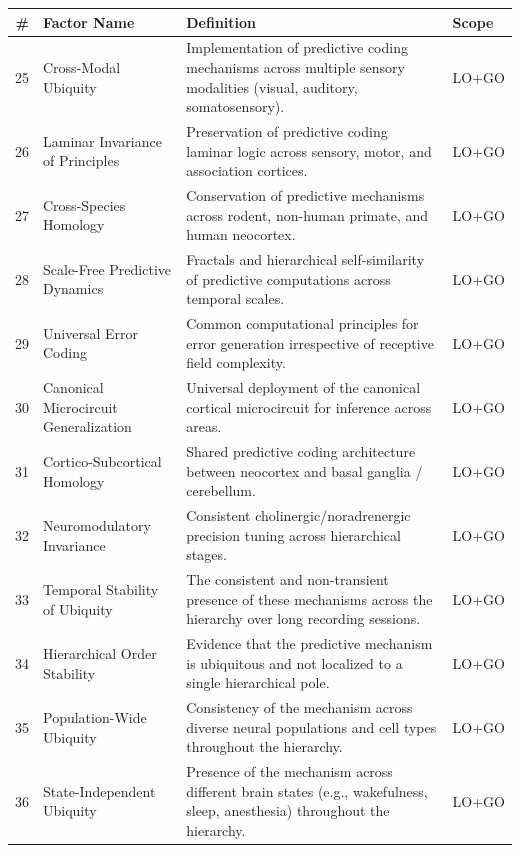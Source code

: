 \documentclass[12pt]{article}
\begin{document}
\newpage

\begingroup
\small
\noindent\begin{tabularx}{\textwidth}{@{}r p{1.9in} >{\raggedright\arraybackslash}X l@{}}
\toprule
\textbf{\#} & \textbf{Factor Name} & \textbf{Definition} & \textbf{Scope} \\
\midrule
25 & Cross-Modal Ubiquity & Implementation of predictive coding mechanisms across multiple sensory modalities (visual, auditory, somatosensory). & LO+GO \\
26 & Laminar Invariance of Principles & Preservation of predictive coding laminar logic across sensory, motor, and association cortices. & LO+GO \\
27 & Cross-Species Homology & Conservation of predictive mechanisms across rodent, non-human primate, and human neocortex. & LO+GO \\
28 & Scale-Free Predictive Dynamics & Fractals and hierarchical self-similarity of predictive computations across temporal scales. & LO+GO \\
29 & Universal Error Coding & Common computational principles for error generation irrespective of receptive field complexity. & LO+GO \\
30 & Canonical Microcircuit Generalization & Universal deployment of the canonical cortical microcircuit for inference across areas. & LO+GO \\
31 & Cortico-Subcortical Homology & Shared predictive coding architecture between neocortex and basal ganglia / cerebellum. & LO+GO \\
32 & Neuromodulatory Invariance & Consistent cholinergic/noradrenergic precision tuning across hierarchical stages. & LO+GO \\
33 & Temporal Stability of Ubiquity & The consistent and non-transient presence of these mechanisms across the hierarchy over long recording sessions. & LO+GO \\
34 & Hierarchical Order Stability & Evidence that the predictive mechanism is ubiquitous and not localized to a single hierarchical pole. & LO+GO \\
35 & Population-Wide Ubiquity & Consistency of the mechanism across diverse neural populations and cell types throughout the hierarchy. & LO+GO \\
36 & State-Independent Ubiquity & Presence of the mechanism across different brain states (e.g., wakefulness, sleep, anesthesia) throughout the hierarchy. & LO+GO \\
\bottomrule
\end{tabularx}
\endgroup
\vspace{0.4em}
\end{document}
